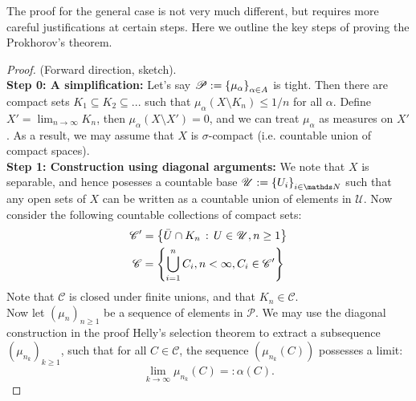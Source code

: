 \begin{unexaminable}
The proof for the general case is not very much different, but requires more careful justifications at certain steps. Here we outline the key steps of proving the Prokhorov's theorem.

\begin{proof}
(Forward direction, sketch). \\

\textbf{Step 0: A simplification:} Let's say $\mathcal{P} := \left\{ \mu_\alpha \right \}_{\alpha \in A}$ is tight. Then there are compact sets $K_1 \subseteq K_2 \subseteq ...$ such that $\mu_\alpha(X \setminus K_n) \leq 1/n$ for all $\alpha$. Define $X' = \lim_{n\to\infty} K_n$, then $\mu_\alpha(X \setminus X') = 0$, and we can treat $\mu_\alpha$ as measures on $X'$. As a result, we may assume that $X$ is $\sigma$-compact (i.e. countable union of compact spaces). \\

\textbf{Step 1: Construction using diagonal arguments:} We note that $X$ is separable, and hence posesses a countable base $\mathcal{U} := \set{U_i}_{i \in \N}$ such that any open sets of $X$ can be written as a countable union of elements in $\mathcal{U}$. Now consider the following countable collections of compact sets:
\begin{gather}
\mathcal{C}' = \left\{ \bar{U} \cap K_n \,:\, U \in \mathcal{U}, n \geq 1 \right \} \\
\mathcal{C} = \left\{ \bigcup_{i=1}^n C_i, n<\infty, C_i \in \mathcal{C}' \right \}
\end{gather}
Note that $\mathcal{C}$ is closed under finite unions, and that $K_n \in \mathcal{C}$. \\

Now let $(\mu_n)_{n\geq 1}$ be a sequence of elements in $\mathcal{P}$. We may use the diagonal construction in the proof Helly's selection theorem to extract a subsequence $(\mu_{n_k})_{k\geq 1}$, such that for all $C \in \mathcal{C}$, the sequence $(\mu_{n_k}(C))$ possesses a limit:
\begin{equation*}
    \lim_{k \to \infty} \mu_{n_k}(C) =: \alpha(C).
\end{equation*}


\end{proof}
\end{unexaminable}
